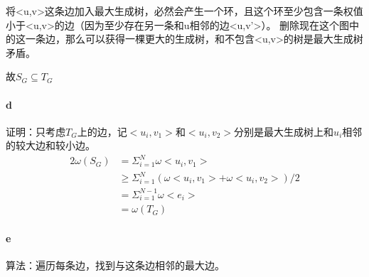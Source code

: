 \documentclass{ctexart}
\begin{document}
将<u,v>这条边加入最大生成树，必然会产生一个环，且这个环至少包含一条权值小于<u,v>的边（因为至少存在另一条和u相邻的边<u,v'>）。
删除现在这个图中的这一条边，那么可以获得一棵更大的生成树，和不包含<u,v>的树是最大生成树矛盾。

故$S_G \subseteq T_G$
\paragraph{d} 
证明：只考虑$T_G$上的边，记$<u_i,v_1>$和$<u_i,v_2>$分别是最大生成树上和$u_i$相邻的较大边和较小边。
\[\begin{aligned}
    2\omega (S_G) &= \Sigma_{i=1}^N \omega<u_i,v_1> \\
    &\ge \Sigma_{i=1}^N (\omega<u_i,v_1>+\omega<u_i,v_2>)/2 \\
    &=\Sigma_{i=1}^{N-1} \omega<e_i>\\
    &=\omega (T_G) 
    \end{aligned}\]
\paragraph{e}
算法：遍历每条边，找到与这条边相邻的最大边。
\end{document}
